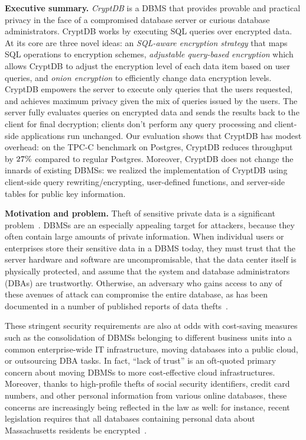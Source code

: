
{\bf Executive summary.} \emph{CryptDB} is a DBMS that provides
provable and practical privacy in the face of a compromised database
server or curious database administrators. CryptDB works by executing
SQL queries over encrypted data.  At its core are three novel ideas:
an \textit{SQL-aware encryption strategy} that maps SQL operations to
encryption schemes, {\em adjustable query-based encryption} which
allows CryptDB to adjust the encryption level of each data item based
on user queries, and \textit{onion encryption} to efficiently change
data encryption levels.  CryptDB empowers the server to execute only
queries that the users requested, and achieves maximum privacy given
the mix of queries issued by the users. The server fully evaluates
queries on encrypted data and sends the results back to the client for
final decryption; clients don't perform any query processing and
client-side applications run unchanged. Our evaluation shows that
CryptDB has modest overhead: on the TPC-C benchmark on Postgres,
CryptDB reduces throughput by $27\%$ compared to regular
Postgres. Moreover, CryptDB does not change the innards of existing
DBMSs: we realized the implementation of CryptDB using client-side
query rewriting/encrypting, user-defined functions, and server-side
tables for public key information.

{\bf Motivation and problem.}  Theft of sensitive private data is a
significant problem~\cite{prc:breaches}.  DBMSs are an especially
appealing target for attackers, because they often contain large
amounts of private information.  When individual users or enterprises
store their sensitive data in a DBMS today, they must trust that the
server hardware and software are uncompromisable, that the data center
itself is physically protected, and assume that the system and
database administrators (DBAs) are trustworthy.  Otherwise, an
adversary who gains access to any of these avenues of attack can
compromise the entire database, as has been documented in a number of
published reports of data thefts~\cite{prc:breaches}.

These stringent security requirements are also at odds with
cost-saving measures such as the consolidation of DBMSs belonging to
different business units into a common enterprise-wide IT
infrastructure, moving databases into a public cloud, or outsourcing
DBA tasks.  In fact, ``lack of trust'' is an oft-quoted primary
concern about moving DBMSs to more cost-effective cloud
infrastructures.  Moreover, thanks to high-profile thefts of social
security identifiers, credit card numbers, and other personal
information from various online databases, these concerns are
increasingly being reflected in the law as well: for instance, recent
legislation requires that all databases containing personal data about
Massachusetts residents be encrypted~\cite{Masslaw}.

